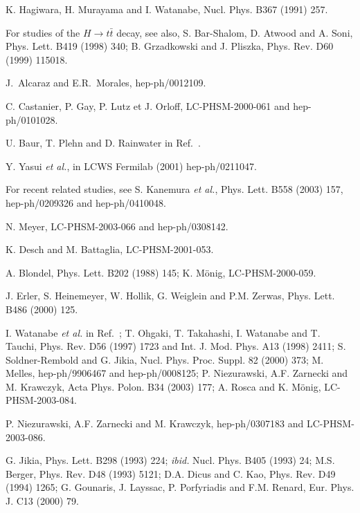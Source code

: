 \begin{thebibliography}{999}
 K. Hagiwara, H. Murayama and I. Watanabe, Nucl. Phys. B367 
(1991) 257. 

 For studies of the $H\to t\bar t$ decay, see also, 
S. Bar-Shalom, D. Atwood and A. Soni, Phys. Lett. B419 (1998) 340; B. 
Grzadkowski and J. Pliszka, Phys. Rev. D60 (1999) 115018.  

 J.~Alcaraz and E.R.~Morales, hep-ph/0012109.

  C. Castanier, P. Gay, P. Lutz et J. Orloff, 
LC-PHSM-2000-061 and hep-ph/0101028.  

 U. Baur, T. Plehn and D. Rainwater in Ref.~\cite{LHC-LC}.

 Y. Yasui {\it et al.}, in LCWS Fermilab (2001) 
hep-ph/0211047. 

 For recent related studies, see  S. Kanemura {\it et al.},
Phys. Lett. B558 (2003) 157, hep-ph/0209326 and hep-ph/0410048.  

 N. Meyer, LC-PHSM-2003-066 and hep-ph/0308142. 
          
 K. Desch and M. Battaglia, LC-PHSM-2001-053. 

 A. Blondel, Phys. Lett. B202 (1988) 145; K. M\"onig,
LC-PHSM-2000-059. 

 J. Erler, S. Heinemeyer, W. Hollik, G. Weiglein and 
P.M. Zerwas, Phys. Lett. B486 (2000) 125. 


 I. Watanabe {\it et al.} in Ref.~\cite{JLC}; T. Ohgaki, T. 
Takahashi, I. Watanabe and
T. Tauchi, Phys. Rev. D56 (1997) 1723 and Int. J. Mod. Phys. A13 (1998) 2411; 
S. Soldner-Rembold and G. Jikia, Nucl. Phys. Proc. Suppl.  82 (2000) 373;  
M. Melles, hep-ph/9906467 and hep-ph/0008125;
P. Niezurawski, A.F. Zarnecki and M. Krawczyk, Acta Phys. Polon. B34 (2003) 
177; A. Rosca and K. M\"onig, LC-PHSM-2003-084.
 
 P. Niezurawski, A.F. Zarnecki and M. Krawczyk, 
hep-ph/0307183 and  LC-PHSM-2003-086. 

 G. Jikia, Phys. Lett. B298 (1993) 224; {\it ibid.} Nucl. 
Phys. B405 (1993) 24; M.S. Berger, Phys. Rev. D48 (1993) 5121; D.A. Dicus and 
C. Kao, Phys. Rev. D49 (1994) 1265; G. Gounaris, J. Layssac, P. Porfyriadis 
and F.M. Renard,  Eur. Phys. J. C13 (2000) 79. 


\end{thebibliography}
